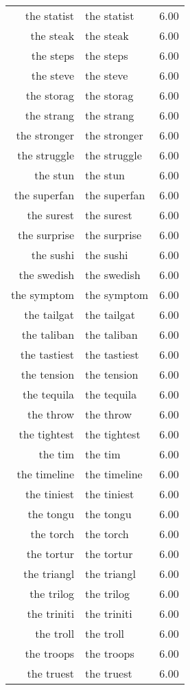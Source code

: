 \begin{table}[ht]
\begin{tabular}{rlr}
  the statist & the statist & 6.00 \\ 
  the steak & the steak & 6.00 \\ 
  the steps & the steps & 6.00 \\ 
  the steve & the steve & 6.00 \\ 
  the storag & the storag & 6.00 \\ 
  the strang & the strang & 6.00 \\ 
  the stronger & the stronger & 6.00 \\ 
  the struggle & the struggle & 6.00 \\ 
  the stun & the stun & 6.00 \\ 
  the superfan & the superfan & 6.00 \\ 
  the surest & the surest & 6.00 \\ 
  the surprise & the surprise & 6.00 \\ 
  the sushi & the sushi & 6.00 \\ 
  the swedish & the swedish & 6.00 \\ 
  the symptom & the symptom & 6.00 \\ 
  the tailgat & the tailgat & 6.00 \\ 
  the taliban & the taliban & 6.00 \\ 
  the tastiest & the tastiest & 6.00 \\ 
  the tension & the tension & 6.00 \\ 
  the tequila & the tequila & 6.00 \\ 
  the throw & the throw & 6.00 \\ 
  the tightest & the tightest & 6.00 \\ 
  the tim & the tim & 6.00 \\ 
  the timeline & the timeline & 6.00 \\ 
  the tiniest & the tiniest & 6.00 \\ 
  the tongu & the tongu & 6.00 \\ 
  the torch & the torch & 6.00 \\ 
  the tortur & the tortur & 6.00 \\ 
  the triangl & the triangl & 6.00 \\ 
  the trilog & the trilog & 6.00 \\ 
  the triniti & the triniti & 6.00 \\ 
  the troll & the troll & 6.00 \\ 
  the troops & the troops & 6.00 \\ 
  the truest & the truest & 6.00 \\ 

\end{tabular}
\end{table}
